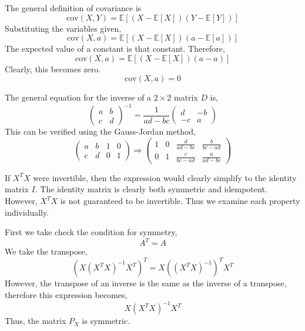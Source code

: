 \documentclass[12pt,twoside]{article}
\begin{document}
\begin{problems}
\begin{problemparts}
\problempart %

The general definition of covariance is
$$ \mathrm{cov}(X, Y) = \mathbb{E}\left[\left(X - \mathbb{E}[X]\right)\left(Y - 
\mathbb{E}[Y]\right)\right] $$
Substituting the variables given,
$$ \mathrm{cov}(X, a) = \mathbb{E}\left[\left(X - \mathbb{E}[X]\right)\left(a - 
\mathbb{E}[a]\right)\right] $$
The expected value of a constant is that constant. Therefore,
$$ \mathrm{cov}(X, a) = \mathbb{E}\left[\left(X - \mathbb{E}[X]\right)\left(a - 
a\right)\right] $$
Clearly, this becomes zero.
$$ \boxed{\mathrm{cov}(X, a) = 0} $$

\end{problemparts}

\newpage

\problem  %

The general equation for the inverse of a $2 \times 2$ matrix $D$ is,
$$ \boxed{\begin{pmatrix}
    a & b \\
    c & d
\end{pmatrix}^{-1} = \frac{1}{ad - bc} \begin{pmatrix}
    d & -b \\
    -c & a
\end{pmatrix}} $$
This can be verified using the Gauss-Jordan method,
$$ \begin{pmatrix}
    a & b & 1 & 0 \\
    c & d & 0 & 1
\end{pmatrix} \Longrightarrow \begin{pmatrix}
    1 & 0 & \frac{d}{ad-bc} & \frac{b}{bc-ad} \\
    0 & 1 & \frac{c}{bc-ad} & \frac{a}{ad-bc}
\end{pmatrix} $$

\problem  %

If $X^TX$ were invertible, then the expression would clearly simplify to the
identity matrix $I$. The identity matrix is clearly both symmetric and 
idempotent. However, $X^T X$ is not guaranteed to be invertible. Thus we examine
each property individually.

First we take check the condition for symmetry,
$$ A^T = A $$
We take the transpose,
$$ \left(X \left(X^T X\right)^{-1} X^T\right)^T = X \left(\left(X^T
X\right)^{-1}\right)^T X^T $$
However, the transpose of an inverse is the same as the inverse of a transpose,
therefore this expression becomes,
$$ \boxed{X \left(X^T X\right)^{-1} X^T} $$
Thus, the matrix $P_X$ is symmetric.


\end{problems}
\end{document}
